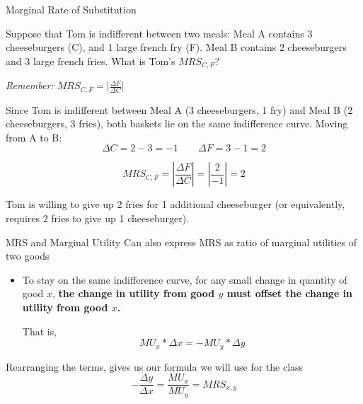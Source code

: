 \documentclass{beamer}
\begin{document}
\begin{frame}{Marginal Rate of Substitution}

  \bigskip
  Suppose that Tom is indifferent between two meals: Meal A contains 3 cheeseburgers (C), and 1 large french fry (F). Meal B contains 2 cheeseburgers and 3 large french fries. What is Tom's $MRS_{C,F}$?

  \emph{Remember: $MRS_{C,F} = \vert \frac{\Delta F}{\Delta C} \vert$}
\end{frame}

\begin{frame}

  \bigskip
  Since Tom is indifferent between Meal A (3 cheeseburgers, 1 fry) and Meal B (2 cheeseburgers, 3 fries), both baskets lie on the same indifference curve. Moving from A to B:
  $$
    \Delta C = 2 - 3 = -1 \qquad \Delta F = 3 - 1 = 2
  $$

  \bigskip
  $$
    MRS_{C,F} = \left\vert \frac{\Delta F}{\Delta C} \right\vert = \left\vert \frac{2}{-1} \right\vert = 2
  $$

  \bigskip
  Tom is willing to give up 2 fries for 1 additional cheeseburger (or equivalently, requires 2 fries to give up 1 cheeseburger).
\end{frame}

\begin{frame}{MRS and Marginal Utility}
  Can also express MRS as ratio of marginal utilities of two goods
  \begin{itemize}
    \item To stay on the same indifference curve, for any small change in quantity of good $x$, \textbf{the change in utility from good $y$ must offset the change in utility from good $x$.}
    
    That is, 
    $$
      MU_x * \Delta x = - MU_y * \Delta y
    $$ 
  \end{itemize}
  
  \bigskip
  Rearranging the terms, gives us our formula we will use for the class 
  $$
    -\frac{\Delta y}{\Delta x} = \frac{MU_x}{MU_y} = MRS_{x,y}
  $$
\end{frame}
\end{document}
